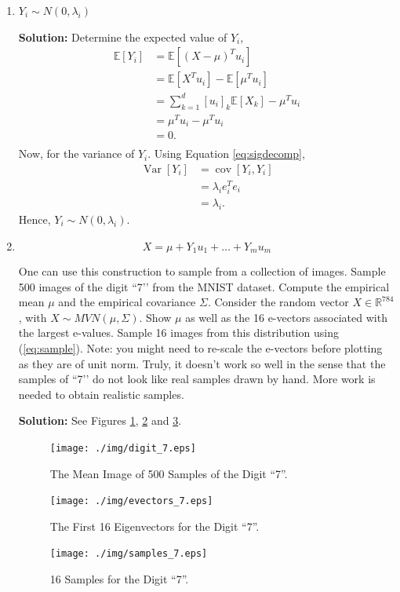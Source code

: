 \documentclass{article}[12pt]
\begin{document}
\begin{enumerate}
\item $Y_i \sim N(0,\lambda_i)$

	\textbf{Solution: }Determine the expected value of $Y_i$,
	\begin{equation}
		\begin{aligned}
			\mathbb E \left[ Y_i \right] &= \mathbb E \left[ \left( X- \mu \right)^T u_i \right] \\
						     &= \mathbb E \left[ X^T u_i \right] - \mathbb E \left[ \mu^T u_i \right] \\
						     &= \sum^{d}_{k=1} \left[ u_i \right]_k \mathbb E \left[ X_k \right] - \mu^T u_i \\
						     &= \mu^T u_i - \mu^T u_i \\
						     &= 0. \\
		\end{aligned}
	\end{equation}
Now, for the variance of $Y_i$. Using Equation \ref{eq:sigdecomp},
\begin{equation}
	\begin{aligned}
		\operatorname{Var} \left[ Y_i \right] &= \operatorname{cov} \left[ Y_i, Y_i \right] \\
						      &= \lambda_i e^T_i e_i \\
						      &= \lambda_i.
	\end{aligned}
\end{equation}
Hence, $Y_i \sim N(0, \lambda_i) $.
	
\item 
\begin{equation}
\label{eq:sample}
X = \mu + Y_1 u_1 + \ldots + Y_m u_m
\end{equation}

One can use this construction to sample from a collection of images. Sample 500 images of the digit ``7\rq\rq{} from the MNIST dataset. 
Compute the empirical mean $\mu$ and the empirical covariance $\Sigma$. Consider the random vector $X \in \mathbb{R}^{784}$, with $X \sim MVN (\mu,\Sigma)$. 
Show $\mu$ as well as the 16 e-vectors associated with the largest e-values.  Sample 16 images from this distribution using (\ref{eq:sample}). Note: you might need to re-scale the e-vectors before plotting as they are of unit norm.  Truly, it doesn\rq{}t work so well in the sense that the samples of ``7\rq\rq{} do not look like real samples drawn by hand. More work is needed to obtain realistic samples.

\textbf{Solution: }See Figures \ref{fig:mean}, \ref{fig:evec} and \ref{fig:samps}.
\begin{figure}
	\centering
	\texttt{[image: ./img/digit\_7.eps]}
	\caption{The Mean Image of 500 Samples of the Digit ``7''.}%
	\label{fig:mean}
\end{figure}
\begin{figure}
	\centering
	\texttt{[image: ./img/evectors\_7.eps]}
	\caption{The First 16 Eigenvectors for the Digit ``7''.}%
	\label{fig:evec}
\end{figure}
\begin{figure}
	\centering
	\texttt{[image: ./img/samples\_7.eps]}
	\caption{16 Samples for the Digit ``7''.}%
	\label{fig:samps}
\end{figure}


\end{enumerate}
\end{document}
